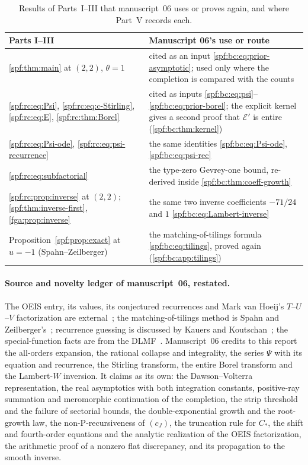 \documentclass[11pt]{article}
\numberwithin{equation}{section}
\theoremstyle{definition}
\theoremstyle{remark}
\theoremstyle{definition}
\newcommand{\bcC}{C_{\!*}}
\begin{document}
\begin{table}[htbp]
\centering\small
\renewcommand{\arraystretch}{1.12}
\begin{tabular}{@{}>{\raggedright\arraybackslash}p{}>{\raggedright\arraybackslash}p{}@{}}
\toprule
Parts I--III & Manuscript 06's use or route\\
\midrule
\cref{spf:thm:main} at $(2,2)$, $\theta=1$ &
cited as an input \eqref{spf:bc:eq:prior-asymptotic}; used only where the
completion is compared with the counts\\
\eqref{spf:rc:eq:Psi}, \eqref{spf:rc:eq:c-Stirling}, \eqref{spf:rc:eq:E},
\cref{spf:rc:thm:Borel} &
cited as inputs \eqref{spf:bc:eq:psi}--\eqref{spf:bc:eq:prior-borel}; the
explicit kernel gives a second proof that $\mathcal E'$ is entire
(\cref{spf:bc:thm:kernel})\\
\eqref{spf:rc:eq:Psi-ode}, \eqref{spf:rc:eq:psi-recurrence} &
the same identities \eqref{spf:bc:eq:Psi-ode}, \eqref{spf:bc:eq:psi-rec}\\
\eqref{spf:rc:eq:subfactorial} &
the type-zero Gevrey-one bound, re-derived inside
\cref{spf:bc:thm:coeff-growth}\\
\cref{spf:rc:prop:inverse} at $(2,2)$; \cref{spf:thm:inverse-first},
\cref{fga:prop:inverse} &
the same two inverse coefficients $-71/24$ and $1$
\eqref{spf:bc:eq:Lambert-inverse}\\
Proposition~\ref{spf:prop:exact} at $u=-1$ (Spahn--Zeilberger) &
the matching-of-tilings formula \eqref{spf:bc:eq:tilings}, proved again
(\cref{spf:bc:app:tilings})\\
\bottomrule
\end{tabular}
\caption{Results of Parts~I--III that manuscript~06 uses or proves again, and
where Part~V records each.}
\label{spf:bc:tab:routes}
\end{table}

\paragraph{Source and novelty ledger of manuscript~06, restated.}
The OEIS entry, its values, its conjectured recurrences and Mark van Hoeij's
$T$--$U$--$V$ factorization are external~\cite{bcOeis}; the matching-of-tilings
method is Spahn and Zeilberger's~\cite{spahn}; recurrence guessing is
discussed by Kauers and Koutschan~\cite{kauers}; the special-function facts
are from the DLMF~\cite{bcDlmfDawson,bcDlmfErf,bcDlmfEone,bcDlmfWatson,bcDlmfStokes,dlmfGamma}.
Manuscript~06 credits to this report the all-orders expansion, the rational
collapse and integrality, the series $\Psi$ with its equation and recurrence,
the Stirling transform, the entire Borel transform and the Lambert-$W$
inversion. It claims as its own: the Dawson--Volterra representation, the
real asymptotics with both integration constants, positive-ray summation and
meromorphic continuation of the completion, the strip threshold and the
failure of sectorial bounds, the double-exponential growth and the root-growth
law, the non-P-recursiveness of $(c_J)$, the truncation rule for $\bcC$, the
shift and fourth-order equations and the analytic realization of the OEIS
factorization, the arithmetic proof of a nonzero flat discrepancy, and its
propagation to the smooth inverse.
\end{document}
